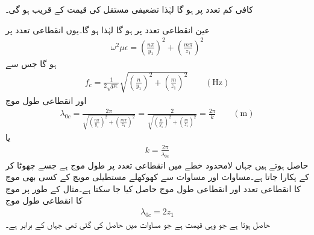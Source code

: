 کافی کم تعدد پر  ہو گا لہٰذا تضعیفی مستقل کی قیمت    کے قریب ہو گی۔

عین انقطاعی تعدد پر  ہو گا لہٰذا  ہو گا۔یوں انقطاعی تعدد پر
\begin{align}
\omega^2 \mu \epsilon =\left(\frac{n\pi}{y_1}\right)^2+\left(\frac{m\pi}{z_1}\right)^2
\end{align}
ہو گا جس سے 
\begin{align}\label{مساوات_مویج_مستطیلی-انقطاعی_تعدد}
f_c=\frac{1}{2 \sqrt{\mu \epsilon}} \sqrt{\left(\frac{n}{y_1}\right)^2+\left(\frac{m}{z_1}\right)^2} \quad \quad (\si{\hertz})
\end{align}
اور انقطاعی طول موج
\begin{align}\label{مساوات_مویج_مستطیلی-انقطاعی_طول_موج}
\lambda_{0c}=\frac{2\pi}{\sqrt{\left(\frac{n\pi}{y_1}\right)^2+\left(\frac{m\pi}{z_1}\right)^2}}=\frac{2}{\sqrt{\left(\frac{n}{y_1}\right)^2+\left(\frac{m}{z_1}\right)^2}}=\frac{2\pi}{k}  \quad \quad (\si{\meter})
\end{align}
یا
\begin{align}\label{مساوات_مویج_انقطاعی_تعدد_اور_کے}
k=\frac{2\pi}{\lambda_{0c}}
\end{align}
حاصل ہوتے ہیں جہاں  لامحدود خطے میں انقطاعی تعدد پر طول موج ہے جسے چھوٹا کر کے  پکارا جاتا ہے۔مساوات  اور مساوات  سے کھوکھلے مستطیلی مویج کے کسی بھی  موج کا انقطاعی تعدد اور انقطاعی طول موج حاصل کیا جا سکتا ہے۔مثال کے
 طور پر  موج کا انقطاعی طول موج
\begin{align}
\lambda_{0c}=2 z_1
\end{align}
حاصل ہوتا ہے جو وہی قیمت ہے جو مساوات  میں حاصل کی گئی تھی جہاں  کے برابر ہے۔ 

